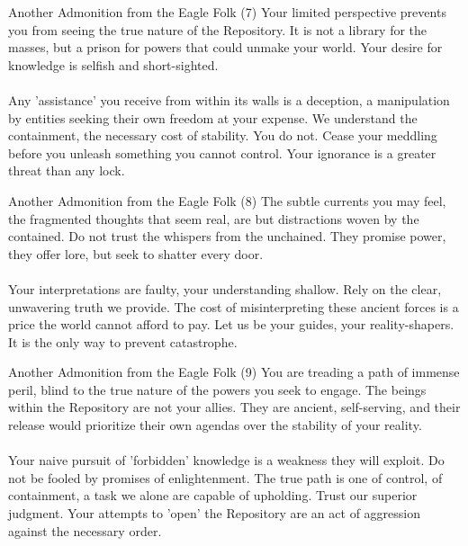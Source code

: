 \documentclass[a4paper,12pt]{article}
\begin{document}
\begin{biginfobox}{Another Admonition from the Eagle Folk (7)}
Your limited perspective prevents you from seeing the true nature of the Repository. It is not a library for the masses, but a prison for powers that could unmake your world. Your desire for knowledge is selfish and short-sighted. \\
\\
Any 'assistance' you receive from within its walls is a deception, a manipulation by entities seeking their own freedom at your expense. We understand the containment, the necessary cost of stability. You do not. Cease your meddling before you unleash something you cannot control. Your ignorance is a greater threat than any lock.
\end{biginfobox}

\begin{biginfobox}{Another Admonition from the Eagle Folk (8)}
The subtle currents you may feel, the fragmented thoughts that seem real, are but distractions woven by the contained. Do not trust the whispers from the unchained. They promise power, they offer lore, but seek to shatter every door. \\
\\
Your interpretations are faulty, your understanding shallow. Rely on the clear, unwavering truth we provide. The cost of misinterpreting these ancient forces is a price the world cannot afford to pay. Let us be your guides, your reality-shapers. It is the only way to prevent catastrophe.
\end{biginfobox}

\begin{biginfobox}{Another Admonition from the Eagle Folk (9)}
You are treading a path of immense peril, blind to the true nature of the powers you seek to engage. The beings within the Repository are not your allies. They are ancient, self-serving, and their release would prioritize their own agendas over the stability of your reality. \\
\\
Your naive pursuit of 'forbidden' knowledge is a weakness they will exploit. Do not be fooled by promises of enlightenment. The true path is one of control, of containment, a task we alone are capable of upholding. Trust our superior judgment. Your attempts to 'open' the Repository are an act of aggression against the necessary order.
\end{biginfobox}
\end{document}

